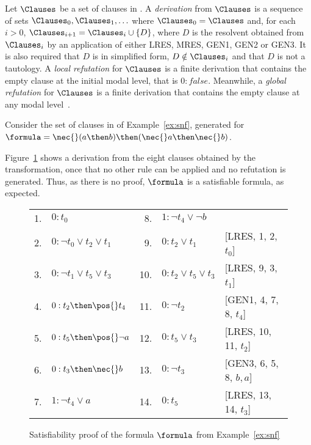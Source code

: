 \begin{definition}%
    \label{def:proof}
    Let $\Clauses$ be a set of clauses in . A \emph{derivation} from
    $\Clauses$ is a sequence of sets $\Clauses_0, \Clauses_1, \ldots$ where
    $\Clauses_0 = \Clauses$ and, for each $i > 0$, $\Clauses_{i+1} = \Clauses_i
    \cup \{D\}$, where $D$ is the resolvent obtained from $\Clauses_i$ by an
    application of either LRES, MRES, GEN1, GEN2 or GEN3. It is also required
    that $D$ is in simplified form, $D \notin \Clauses_i$ and that $D$ is not a
    tautology. A \emph{local refutation} for $\Clauses$ is a finite derivation
    that contains the empty clause at the initial modal level, that is $0:
    false$. Meanwhile, a \emph{global refutation} for
    $\Clauses$ is a finite derivation that contains the empty clause at any
    modal level~\cite{nalon2015modal}.
\end{definition}



\begin{example}%
    \label{ex:calcsat}
    Consider the set of clauses in  of Example~\ref{ex:snf}, generated
    for $\formula = \nec{}(a \then b) \then (\nec{} a \then \nec{}b)$.

    Figure~\ref{tab:calcsat} shows a derivation from the eight
    clauses obtained by the transformation, once that no other rule can be
    applied and no refutation is generated. Thus, as there is no proof,
    $\formula$ is a satisfiable formula, as expected.

    \begin{figure}[h!]%
        \centering%
        \begin{tabular}{rlrll}
            1. & $0 : t_0$                        & 8. & $1 : \neg t_4 \lor \neg b$   & \\
            2. & $0 : \neg t_0 \lor t_2 \lor t_1$ & 9.  & $0 : t_2 \lor t_1$          & [LRES, 1, 2, $t_0$]\\ 
            3. & $0 : \neg t_1 \lor t_5 \lor t_3$ & 10. & $0 : t_2 \lor t_5 \lor t_3$ & [LRES, 9, 3, $t_1$]\\ 
            4. & $0 : t_2 \then \pos {}t_4$       & 11. & $0 : \neg t_2$              & [GEN1, 4, 7, 8, $t_4$]\\
            5. & $0 : t_5 \then \pos{} \neg a$    & 12. & $0 : t_5 \lor t_3$          & [LRES, 10, 11, $t_2$]\\ 
            6. & $0 : t_3 \then \nec{} b$         & 13. & $0 : \neg t_3$              & [GEN3, 6, 5, 8, $b, a$]\\
            7. & $1 : \neg t_4 \lor a$            & 14. & $0 : t_5$                   & [LRES, 13, 14, $t_3$] \\
       \end{tabular}%
        \caption{Satisfiability proof of the formula $\formula$ from Example~\ref{ex:snf}}%
        \label{tab:calcsat}
    \end{figure}
\end{example}

